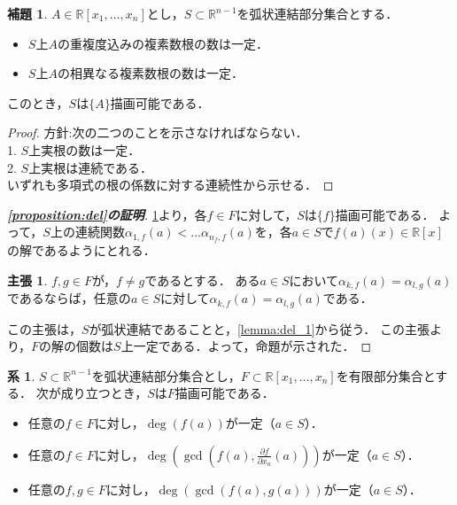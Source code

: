 \documentclass[uplatex, dvipdfmx]{jsarticle}
\newcommand{\R}{\mathbb{R}}
\theoremstyle{definition}
\newtheorem{lemma}{補題}[section]
\newtheorem{corollary}{系}[section]
\newtheorem*{claim*}{主張}
\begin{document}
\begin{lemma}\label{lemma:del_2}
$A \in \R[x_1, \dots, x_n]$とし，$S \subset \R^{n-1}$を弧状連結部分集合とする．
\begin{itemize}
\item $S$上$A$の重複度込みの複素数根の数は一定．
\item $S$上$A$の相異なる複素数根の数は一定．
\end{itemize}
このとき，$S$は$\{A\}$描画可能である．
\end{lemma}

\begin{proof}
方針:次の二つのことを示さなければならない．\\
1.  $S$上実根の数は一定．\\
2.  $S$上実根は連続である．\\
いずれも多項式の根の係数に対する連続性から示せる．
\end{proof}

\begin{proof}[{\bf \cref{proposition:del}の証明}]
\cref{lemma:del_2}より，各$f \in F$に対して，$S$は$\{f\}$描画可能である．
よって，$S$上の連続関数$\alpha_{1,f}(a) < \dots \alpha_{n_f, f}(a)$を，各$a \in S$で$f(a)(x) \in \R[x]$の解であるようにとれる．

\begin{claim*}
$f, g \in F$が，$f \neq g$であるとする．
ある$a \in S$において$\alpha_{k,f}(a) = \alpha_{l,g}(a)$であるならば，任意の$a \in S$に対して$\alpha_{k,f}(a) = \alpha_{l,g}(a)$である．
\end{claim*}

この主張は，$S$が弧状連結であることと，\cref{lemma:del_1}から従う．
この主張より，$F$の解の個数は$S$上一定である．よって，命題が示された．
\end{proof}

\begin{corollary}\label{corollary:del}
$S \subset \R^{n-1}$を弧状連結部分集合とし，$F \subset \R[x_1,\dots, x_n]$を有限部分集合とする．
次が成り立つとき，$S$は$F$描画可能である．
\begin{itemize}
\item 任意の$f \in F$に対し，$\deg(f(a))$が一定（$a \in S$）．
\item 任意の$f \in F$に対し，$\deg(\gcd(f(a), \frac{\partial f}{\partial x_n}(a)))$が一定（$a \in S$）．
\item 任意の$f, g \in F$に対し，$\deg(\gcd(f(a), g(a)))$が一定（$a \in S$）．
\end{itemize}
\end{corollary}
\end{document}
